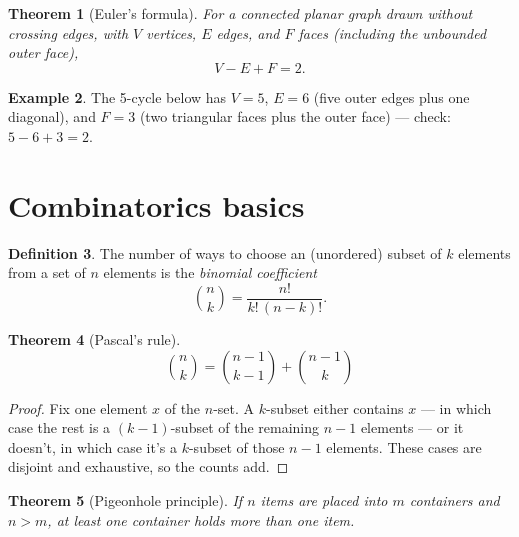 \documentclass[11pt]{article}
\newtheorem{theorem}{Theorem}[section]
\theoremstyle{definition}
\newtheorem{definition}[theorem]{Definition}
\newtheorem{example}[theorem]{Example}
\begin{document}
\begin{theorem}[Euler's formula]
For a connected planar graph drawn without crossing edges, with $V$
vertices, $E$ edges, and $F$ faces (including the unbounded outer face),
\[
  V - E + F = 2.
\]
\end{theorem}

\begin{example}
The 5-cycle below has $V = 5$, $E = 6$ (five outer edges plus one diagonal),
and $F = 3$ (two triangular faces plus the outer face) — check:
$5 - 6 + 3 = 2$.
\end{example}

\begin{center}
\end{center}

\section{Combinatorics basics}

\begin{definition}
The number of ways to choose an (unordered) subset of $k$ elements from a
set of $n$ elements is the \emph{binomial coefficient}
\[
  \binom{n}{k} = \frac{n!}{k!\,(n-k)!}.
\]
\end{definition}

\begin{theorem}[Pascal's rule]
\[
  \binom{n}{k} = \binom{n-1}{k-1} + \binom{n-1}{k}
\]
\end{theorem}

\begin{proof}
Fix one element $x$ of the $n$-set. A $k$-subset either contains $x$ — in
which case the rest is a $(k-1)$-subset of the remaining $n-1$ elements —
or it doesn't, in which case it's a $k$-subset of those $n-1$ elements.
These cases are disjoint and exhaustive, so the counts add.
\end{proof}

\begin{theorem}[Pigeonhole principle]
If $n$ items are placed into $m$ containers and $n > m$, at least one
container holds more than one item.
\end{theorem}
\end{document}
